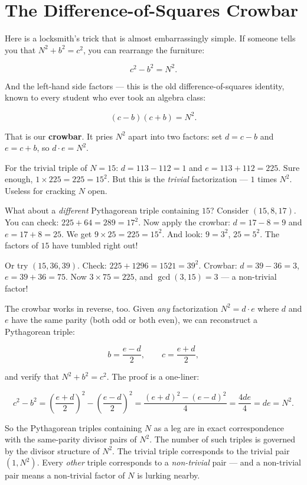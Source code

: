 \bigskip

\section*{The Difference-of-Squares Crowbar}

Here is a locksmith's trick that is almost embarrassingly simple. If someone tells you that $N^2 + b^2 = c^2$, you can rearrange the furniture:

\[
c^2 - b^2 = N^2.
\]

And the left-hand side factors --- this is the old difference-of-squares identity, known to every student who ever took an algebra class:

\[
(c - b)(c + b) = N^2.
\]

That is our \textbf{crowbar}. It pries $N^2$ apart into two factors: set $d = c - b$ and $e = c + b$, so $d \cdot e = N^2$.

For the trivial triple of $N = 15$: $d = 113 - 112 = 1$ and $e = 113 + 112 = 225$. Sure enough, $1 \times 225 = 225 = 15^2$. But this is the \textit{trivial} factorization --- $1$ times $N^2$. Useless for cracking $N$ open.

What about a \textit{different} Pythagorean triple containing $15$? Consider $(15, 8, 17)$. You can check: $225 + 64 = 289 = 17^2$. Now apply the crowbar: $d = 17 - 8 = 9$ and $e = 17 + 8 = 25$. We get $9 \times 25 = 225 = 15^2$. And look: $9 = 3^2$, $25 = 5^2$. The factors of $15$ have tumbled right out!

Or try $(15, 36, 39)$. Check: $225 + 1296 = 1521 = 39^2$. Crowbar: $d = 39 - 36 = 3$, $e = 39 + 36 = 75$. Now $3 \times 75 = 225$, and $\gcd(3, 15) = 3$ --- a non-trivial factor!

The crowbar works in reverse, too. Given \textit{any} factorization $N^2 = d \cdot e$ where $d$ and $e$ have the same parity (both odd or both even), we can reconstruct a Pythagorean triple:

\[
b = \frac{e - d}{2}, \qquad c = \frac{e + d}{2},
\]

and verify that $N^2 + b^2 = c^2$. The proof is a one-liner:

\[
c^2 - b^2 = \left(\frac{e+d}{2}\right)^{\!2} - \left(\frac{e-d}{2}\right)^{\!2} = \frac{(e+d)^2 - (e-d)^2}{4} = \frac{4de}{4} = de = N^2.
\]

So the Pythagorean triples containing $N$ as a leg are in exact correspondence with the same-parity divisor pairs of $N^2$. The number of such triples is governed by the divisor structure of $N^2$. The trivial triple corresponds to the trivial pair $(1, N^2)$. Every \textit{other} triple corresponds to a \textit{non-trivial} pair --- and a non-trivial pair means a non-trivial factor of $N$ is lurking nearby.


